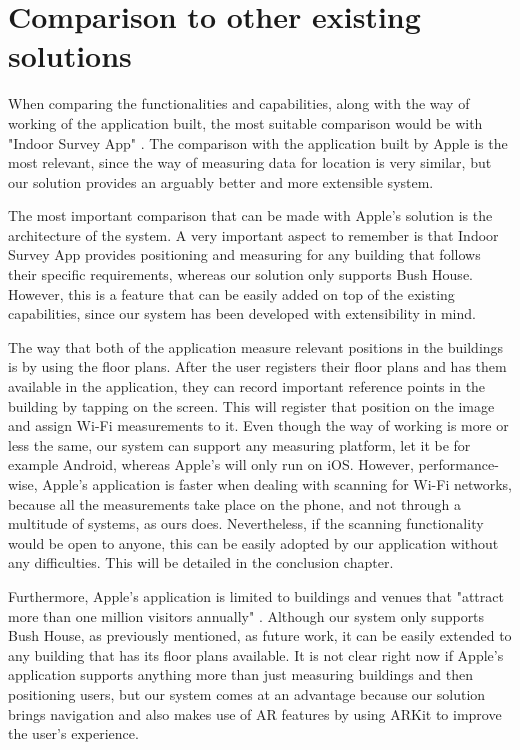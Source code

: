 

\section{Comparison to other existing solutions}
When comparing the functionalities and capabilities, along with the way of working of the application built, the most suitable comparison would be with "Indoor Survey App" \cite{apple-indoor-survey}. The comparison with the application built by Apple is the most relevant, since the way of measuring data for location is very similar, but our solution provides an arguably better and more extensible system.

The most important comparison that can be made with Apple's solution is the architecture of the system. A very important aspect to remember is that Indoor Survey App provides positioning and measuring for any building that follows their specific requirements, whereas our solution only supports Bush House. However, this is a feature that can be easily added on top of the existing capabilities, since our system has been developed with extensibility in mind.

The way that both of the application measure relevant positions in the buildings is by using the floor plans. After the user registers their floor plans and has them available in the application, they can record important reference points in the building by tapping on the screen. This will register that position on the image and assign Wi-Fi measurements to it. Even though the way of working is more or less the same, our system can support any measuring platform, let it be for example Android, whereas Apple's will only run on iOS. However, performance-wise, Apple's application is faster when dealing with scanning for Wi-Fi networks, because all the measurements take place on the phone, and not through a multitude of systems, as ours does. Nevertheless, if the scanning functionality would be open to anyone, this can be easily adopted by our application without any difficulties. This will be detailed in the conclusion chapter.

Furthermore, Apple's application is limited to buildings and venues that "attract more than one million visitors annually" \cite{apple-indoor-survey}. Although our system only supports Bush House, as previously mentioned, as future work, it can be easily extended to any building that has its floor plans available. It is not clear right now if Apple's application supports anything more than just measuring buildings and then positioning users, but our system comes at an advantage because our solution brings navigation and also makes use of AR features by using ARKit to improve the user's experience.

